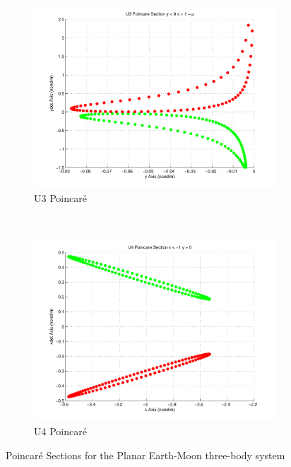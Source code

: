 \begin{figure}
        	\begin{subfigure}[b]{0.5\textwidth}
                \includegraphics[width=\columnwidth]{figures/2015_SSPI/U3_poincare}
                \caption{U3 Poincar\'e}
                \label{fig:u3_poincare}
        	\end{subfigure}%
        	~%
        	\begin{subfigure}[b]{0.5\textwidth}
        \includegraphics[width=\columnwidth]{figures/2015_SSPI/U4_poincare}
    	\caption{U4 Poincar\'e}
    	\label{fig:u4_poincare}
    \end{subfigure}
	\caption{Poincar\'e Sections for the Planar Earth-Moon three-body system}
	\label{fig:poincare_sections}
\end{figure}
